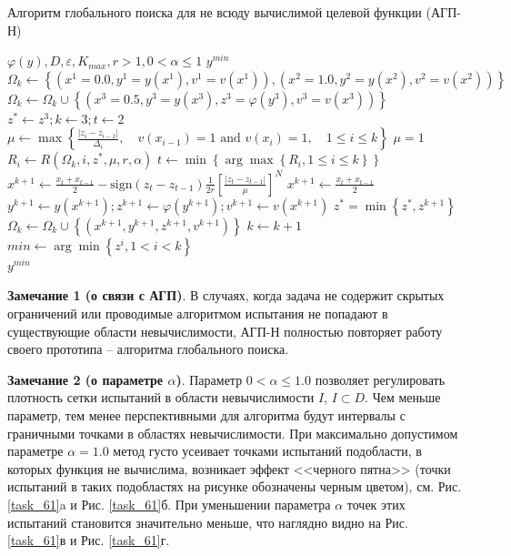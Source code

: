 \documentclass[a4paper,12pt,russian]{article}
\begin{document}
\begin{algorithm}
\caption{Алгоритм глобального поиска для не всюду вычислимой целевой функции (АГП-Н)}\label{main_alg}
\begin{algorithmic}[1]
\Require $\varphi(y), D, \varepsilon, K_{max}, r >1, 0 < \alpha \leq 1$
\Ensure $y^{min}$
\State $\Omega_k \gets \left\{(x^1 = 0.0, y^1 = y(x^1), v^1=v(x^1)), (x^2 = 1.0, y^2 = y(x^2), v^2 = v(x^2))\right\}$
\State $\Omega_k \gets \Omega_k \cup \left\{(x^3 = 0.5, y^3 = y(x^3), z^3 = \varphi(y^3), v^3 = v(x^3))\right\}$
\State $z^* \gets z^3; k \gets 3; t \gets 2$
    \State $\mu \gets \max\left\{ \frac{|z_i-z_{i-1}|}{\Delta _i},\quad v(x_{i-1}) = 1 \text{ and } v(x_i) = 1, \quad 1 \leq i \leq k  \right\}$
       \State $\mu = 1$
   \EndIf
        \State $R_i \gets R(\Omega_k, i, z^*, \mu, r, \alpha)$
    \EndFor
    \State $t \gets \min \left\{\arg\max \left\{ R_i, 1 \leq i \leq k \right\}\right\}$
        \State $x^{k+1} \gets \frac {x_t+x_{t-1}}{2} -  \text{sign} {(z_t-z_{t-1})} \frac{1}{2r} \left[\frac {{|z_t-z_{t-1}|}}{\mu} \right]^N$
    \Else
        \State $x^{k+1} \gets \frac {x_t+x_{t-1}}{2}$
    \EndIf
    \State $y^{k + 1} \gets y(x^{k + 1}); z^{k + 1} \gets \varphi(y^{k + 1}); v^{k+1} \gets v(x^{k+1})$
    \State $z^* = \min \left \{z^*, z^{k+1}\right \}$
    \State$\Omega_k \gets \Omega_k \cup \left\{(x^{k+1}, y^{k+1}, z^{k+1}, v^{k+1})\right\}$
    \State $k \gets k + 1$
\EndWhile
\State $min \gets \arg \min \left\{ z^i, 1 < i < k \right\}$\\
\Return $y^{min}$
\end{algorithmic}
\end{algorithm}

\textbf{Замечание 1 (о связи с АГП)}. В случаях, когда задача не содержит скрытых ограничений или проводимые алгоритмом испытания не попадают в существующие области невычислимости, АГП-Н полностью повторяет работу своего прототипа -- алгоритма глобального поиска.

\textbf{Замечание 2 (о параметре $\alpha$)}. Параметр $0 < \alpha \leq 1.0$ позволяет регулировать плотность сетки испытаний в области невычислимости $I$, $I \subset D$. Чем меньше параметр, тем менее перспективными для алгоритма будут интервалы с граничными точками в областях невычислимости. При максимально допустимом параметре $\alpha = 1.0$ метод густо усеивает точками испытаний подобласти, в которых функция не вычислима, возникает эффект <<черного пятна>> (точки испытаний в таких подобластях на рисунке обозначены черным цветом), см. Рис. \ref{task_61}a и Рис. \ref{task_61}б. При уменьшении параметра $\alpha$ точек этих испытаний становится значительно меньше, что наглядно видно на Рис. \ref{task_61}в и Рис. \ref{task_61}г.
\end{document}

